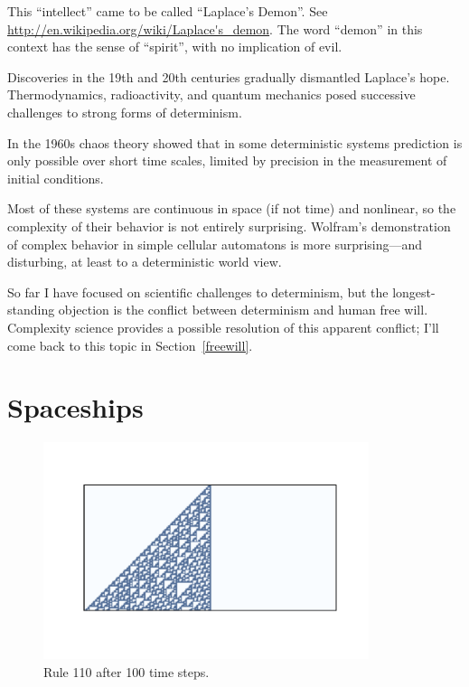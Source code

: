 \documentclass[12pt]{book}
\theoremstyle{exercise}
\begin{document}
This ``intellect'' came to be called ``Laplace's Demon''.
See \url{http://en.wikipedia.org/wiki/Laplace's_demon}.  The word
``demon'' in this context has the sense of ``spirit'', with no
implication of evil.


Discoveries in the 19th and 20th centuries gradually dismantled
Laplace's hope.  Thermodynamics, radioactivity,
and quantum mechanics posed successive challenges to strong
forms of determinism.


In the 1960s chaos theory showed that in some deterministic systems
prediction is only possible over short time scales,  limited by
precision in the measurement of initial conditions.

Most of these systems are continuous in space (if not time) and
nonlinear, so the complexity of their behavior is not entirely
surprising.  Wolfram's demonstration of complex behavior in simple
cellular automatons is more surprising---and disturbing, at least to a
deterministic world view.


So far I have focused on scientific challenges to determinism, but the
longest-standing objection is the conflict between
determinism and human free will.  Complexity science provides
a possible resolution of this apparent conflict; I'll come
back to this topic in Section~\ref{freewill}.



\section{Spaceships}
\label{spaceships}

\begin{figure}
\centerline{\includegraphics[height=2.5in]{figs/chap05-5.pdf}}
\caption{Rule 110 after 100 time steps.}
\label{chap05-5}
\end{figure}
\end{document}
